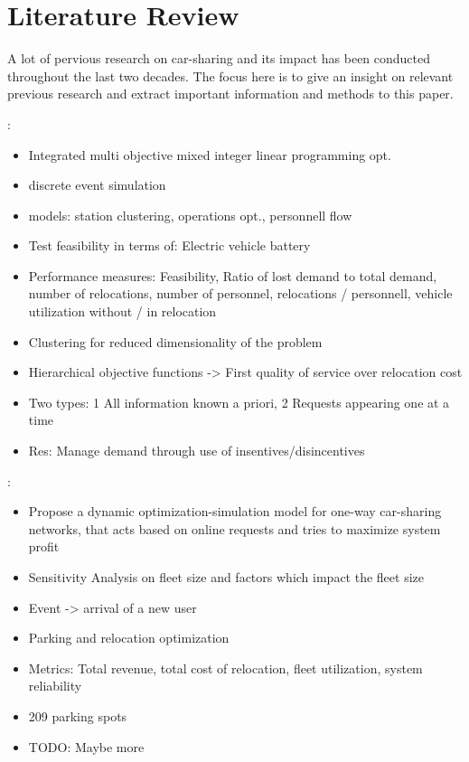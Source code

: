 \clearpage
\section{Literature Review}
\label{sec:lr}

A lot of pervious research on car-sharing and its impact has been conducted throughout
the last two decades. The focus here is to give an insight on relevant previous
research and extract important information and methods to this paper.

\cite{OptSimFramework}:
\begin{itemize}
    \item Integrated multi objective mixed integer linear programming opt.
    \item discrete event simulation
    \item models: station clustering, operations opt., personnell flow 
    \item Test feasibility in terms of: Electric vehicle battery
    \item Performance measures: Feasibility, Ratio of lost demand to total demand, number of relocations, number of personnel, relocations / personnell, vehicle utilization without / in relocation
    \item Clustering for reduced dimensionality of the problem 
    \item Hierarchical objective functions -> First quality of service over relocation cost
    \item Two types: 1 All information known a priori, 2 Requests appearing one at a time
    \item Res: Manage demand through use of insentives/disincentives 
\end{itemize}
    
\cite{Nourinejad2014}:
\begin{itemize}
    \item Propose a dynamic optimization-simulation model for one-way car-sharing networks, that acts based on
    online requests and tries to maximize system profit
    \item Sensitivity Analysis on fleet size and factors which impact the fleet size
    \item Event -> arrival of a new user
    \item Parking and relocation optimization
    \item Metrics: Total revenue, total cost of relocation, fleet utilization, system reliability
    \item 209 parking spots
    \item TODO: Maybe more
\end{itemize}

